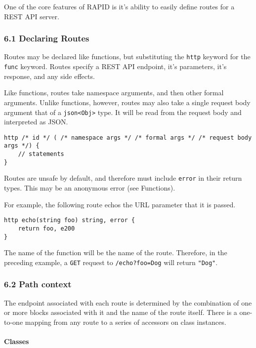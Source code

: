 \documentclass[]{article}
\begin{document}
One of the core features of RAPID is it's ability to easily define
routes for a REST API server.

\subsubsection{6.1 Declaring Routes}\label{declaring-routes}

Routes may be declared like functions, but substituting the
\texttt{http} keyword for the \texttt{func} keyword. Routes specify a
REST API endpoint, it's parameters, it's response, and any side effects.

Like functions, routes take namespace arguments, and then other formal
arguments. Unlike functions, however, routes may also take a single
request body argument that of a
\texttt{json\textless{}Obj\textgreater{}} type. It will be read from the
request body and interpreted as JSON.

\begin{verbatim}
http /* id */ ( /* namespace args */ /* formal args */ /* request body args */) {
    // statements
}
\end{verbatim}

Routes are unsafe by default, and therefore must include \texttt{error}
in their return types. This may be an anonymous error (see Functions).

For example, the following route echos the URL parameter that it is
passed.

\begin{verbatim}
http echo(string foo) string, error {
    return foo, e200
}
\end{verbatim}

The name of the function will be the name of the route. Therefore, in
the preceding example, a \texttt{GET} request to \texttt{/echo?foo=Dog}
will return \texttt{"Dog"}.

\subsubsection{6.2 Path context}\label{path-context}

The endpoint associated with each route is determined by the combination
of one or more blocks associated with it and the name of the route
itself. There is a one-to-one mapping from any route to a series of
accessors on class instances.

\paragraph{Classes}\label{classes-1}
\end{document}
